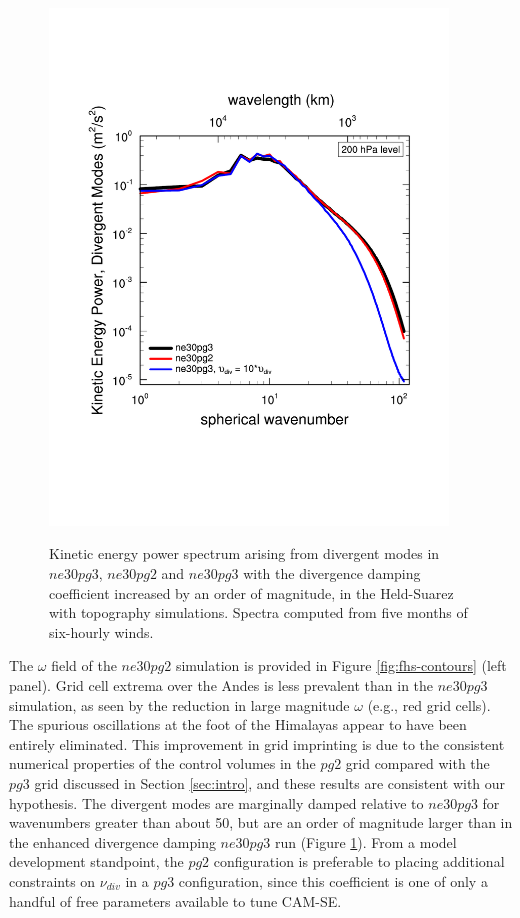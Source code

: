 \documentclass{agujournal}
\begin{document}
\begin{figure}[t]
\begin{center}
\noindent\includegraphics[width=25pc,angle=0]{figs/fhstopo_Divergence_ne30pg2-v-ne30pg3-v-10Xnudiv.pdf}\\
\end{center}
\caption{Kinetic energy power spectrum arising from divergent modes in $ne30pg3$, $ne30pg2$ and $ne30pg3$ with the divergence damping coefficient increased by an order of magnitude, in the Held-Suarez with topography simulations. Spectra computed from five months of six-hourly winds.}
\label{fig:fhs-div}
\end{figure}

The $\omega$ field of the $ne30pg2$ simulation is provided in Figure \ref{fig:fhs-contours} (left panel). Grid cell extrema over the Andes is less prevalent than in the $ne30pg3$ simulation, as seen by the reduction in large magnitude $\omega$ (e.g., red grid cells). The spurious oscillations at the foot of the Himalayas appear to have been entirely eliminated. This improvement in grid imprinting is due to the consistent numerical properties of the control volumes in the $pg2$ grid compared with the $pg3$ grid discussed in Section \ref{sec:intro}, and these results are consistent with our hypothesis. The divergent modes are marginally damped relative to $ne30pg3$ for wavenumbers greater than about 50, but are an order of magnitude larger than in the enhanced divergence damping $ne30pg3$ run (Figure \ref{fig:fhs-div}). From a model development standpoint, the $pg2$ configuration is preferable to placing additional constraints on $\nu_{div}$ in a $pg3$ configuration, since this coefficient is one of only a handful of free parameters available to tune CAM-SE.
\end{document}
